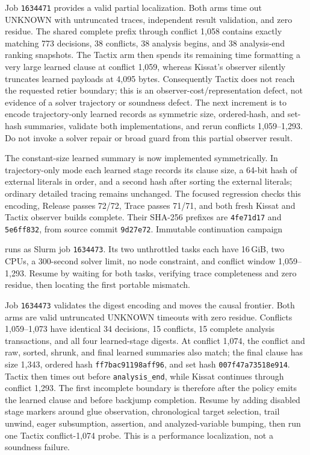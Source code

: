 \documentclass[11pt]{article}
\newcommand{\code}[1]{\texttt{#1}}
\newcommand{\artifact}[1]{\path{#1}}
\begin{document}
Job \code{1634471} provides a valid partial localization. Both arms time out
UNKNOWN with untruncated traces, independent result validation, and zero
residue. The shared complete prefix through conflict 1,058 contains exactly
matching 773 decisions, 38 conflicts, 38 analysis begins, and 38 analysis-end
ranking snapshots. The Tactix arm then spends its remaining time formatting a
very large learned clause at conflict 1,059, whereas Kissat's observer silently
truncates learned payloads at 4,095 bytes. Consequently Tactix does not reach
the requested retier boundary; this is an observer-cost/representation defect,
not evidence of a solver trajectory or soundness defect. The next increment is
to encode trajectory-only learned records as symmetric size, ordered-hash, and
set-hash summaries, validate both implementations, and rerun conflicts
1,059--1,293. Do not invoke a solver repair or broad guard from this partial
observer result.

The constant-size learned summary is now implemented symmetrically. In
trajectory-only mode each learned stage records its clause size, a 64-bit hash
of external literals in order, and a second hash after sorting the external
literals; ordinary detailed tracing remains unchanged. The focused regression
checks this encoding, Release passes 72/72, Trace passes 71/71, and both fresh
Kissat and Tactix observer builds complete. Their SHA-256 prefixes are
\code{4fe71d17} and \code{5e6ff832}, from source commit \code{9d27e72}.
Immutable continuation campaign
\begin{center}\small\artifact{20260819-0559-tierd-rank22-trajectory-digest}\end{center}
runs as Slurm job \code{1634473}. Its two unthrottled tasks each have 16\,GiB,
two CPUs, a 300-second solver limit, no node constraint, and conflict window
1,059--1,293. Resume by waiting for both tasks, verifying trace completeness
and zero residue, then locating the first portable mismatch.

Job \code{1634473} validates the digest encoding and moves the causal frontier.
Both arms are valid untruncated UNKNOWN timeouts with zero residue. Conflicts
1,059--1,073 have identical 34 decisions, 15 conflicts, 15 complete analysis
transactions, and all four learned-stage digests. At conflict 1,074, the
conflict and raw, sorted, shrunk, and final learned summaries also match; the
final clause has size 1,343, ordered hash \code{ff7bac91198aff96}, and set hash
\code{007f47a73518e914}. Tactix then times out before \code{analysis\_end},
while Kissat continues through conflict 1,293. The first incomplete boundary
is therefore after the policy emits the learned clause and before backjump
completion. Resume by adding disabled stage markers around glue observation,
chronological target selection, trail unwind, eager subsumption, assertion,
and analyzed-variable bumping, then run one Tactix conflict-1,074 probe. This is
a performance localization, not a soundness failure.
\end{document}
